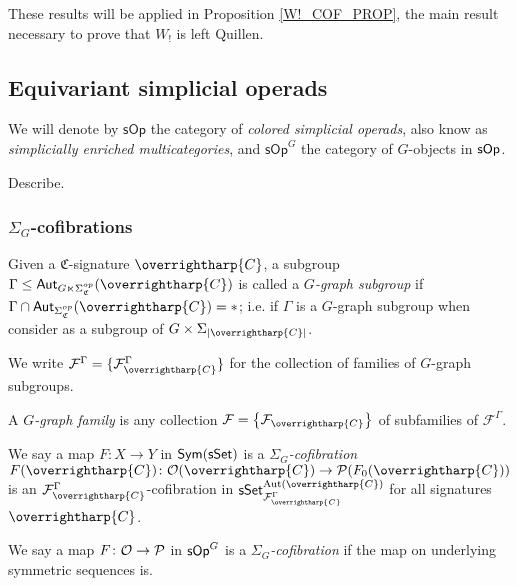\documentclass[a4paper,10pt
,draft
]{article}%
\renewcommand{\F}{\mathcal F}
\renewcommand{\1}{\eta}%
\newcommand{\vect}[1]{\text{\overrightharp{\ensuremath{#1}}}}
\begin{document}
These results will be applied in Proposition \ref{W!_COF_PROP}, the main result necessary to prove that $W_!$ is left Quillen.








\subsection{Equivariant simplicial operads}

We will denote by $\mathsf{sOp}$ the category of \textit{colored simplicial operads}, also know as \textit{simplicially enriched multicategories},
and $\mathsf{sOp}^G$ the category of $G$-objects in $\mathsf{sOp}$.

\begin{definition}
      Describe.
\end{definition}



\subsubsection{$\Sigma_G$-cofibrations}

\begin{definition}
      \label{GRAPHSUB_DEF}
      Given a $\mathfrak{C}$-signature $\vect C$, 
      a subgroup 
      $\Gamma \leq \mathsf{Aut}_{G \ltimes \Sigma_{\mathfrak{C}}^{op}}(\vect C)$
      is called a \textit{$G$-graph subgroup} if
      $\Gamma \cap \mathsf{Aut}_{\Sigma_{\mathfrak{C}}^{op}}(\vect C) = \**$;
      i.e. if $\Gamma$ is a $G$-graph subgroup when consider as a subgroup of $G \times \Sigma_{|\vect C|}$.
      
      We write $\mathcal{F}^{\Gamma} = \{\mathcal{F}^{\Gamma}_{\vect C}\}$
      for the collection of families of $G$-graph subgroups.

      A \textit{$G$-graph family} is any collection $\mathcal F = \set{\F_{\vect C}}$ of subfamilies of $\F^\Gamma$.
\end{definition}

\begin{definition}
      We say a map $F \colon X \to Y$ in $\mathsf{Sym}(\mathsf{sSet})$ is a \textit{$\Sigma_G$-cofibration}
      $F(\vect C)\colon \O(\vect C) \to \P(F_0(\vect C))$ is an $\mathcal F^\Gamma_{\vect C}$-cofibration in $\sSet^{\Aut(\vect C)}_{\F^\Gamma_{\vect  C}}$
      for all signatures $\vect C$.
      
      We say a map $F \colon \mathcal{O} \to \mathcal{P}$ in $\mathsf{sOp}^G$ is a \textit{$\Sigma_G$-cofibration} if
      the map on underlying symmetric sequences is.
\end{definition}
\end{document}
